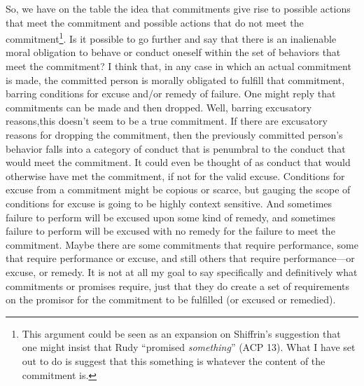 So, we have on the table the idea that commitments give rise to possible
actions that meet the commitment and possible actions that do not meet
the commitment\footnote{This argument could be seen as an expansion on
  Shiffrin's suggestion that one might insist that Rudy ``promised
  \textit{something}'' (ACP 13). What I have set out to do is suggest that
  this something is whatever the content of the commitment is.}. Is it
possible to go further and say that there is an inalienable moral
obligation to behave or conduct oneself within the set of behaviors that
meet the commitment? I think that, in any case in which an actual
commitment is made, the committed person is morally obligated to fulfill
that commitment, barring conditions for excuse and/or remedy of failure.
One might reply that commitments can be made and then dropped. Well,
barring excusatory reasons,this doesn't seem to be a true commitment. If
there are excusatory reasons for dropping the commitment, then the
previously committed person's behavior falls into a category of conduct
that is penumbral to the conduct that would meet the commitment. It
could even be thought of as conduct that would otherwise have met the
commitment, if not for the valid excuse. Conditions for excuse from a
commitment might be copious or scarce, but gauging the scope of
conditions for excuse is going to be highly context sensitive. And
sometimes failure to perform will be excused upon some kind of remedy,
and sometimes failure to perform will be excused with no remedy for the
failure to meet the commitment. Maybe there are some commitments that
require performance, some that require performance or excuse, and still
others that require performance---or excuse, or remedy. It is not at all
my goal to say specifically and definitively what commitments or
promises require, just that they do create a set of requirements on the
promisor for the commitment to be fulfilled (or excused or remedied).

